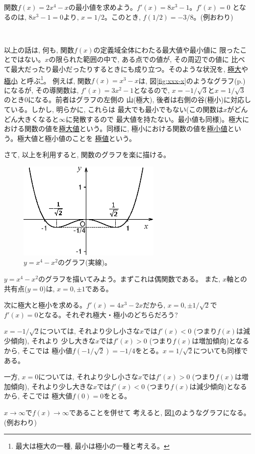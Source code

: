 \begin{exmpl} 関数$f(x)=2x^4-x$の最小値を求めよう。$f'(x)=8x^3-1$。$f'(x)=0$
となるのは, $8x^3-1=0$より, $x=1/2$。このとき, $f(1/2)=-3/8$。(例おわり)\end{exmpl}\

以上の話は, 何も, 関数$f(x)$の定義域全体にわたる最大値や最小値に
限ったことではない。$x$の限られた範囲の中で, ある点での値が, その周辺での値に
比べて最大だったり最小だったりするときにも成り立つ。そのような状況を, 
\underline{極大}や\underline{極小}
と呼ぶ\footnote{最大は極大の一種, 最小は極小の一種と考える。}。
例えば, 関数$f(x)=x^3-x$は, 図\ref{fig:xxx-x}のようなグラフ(p.\pageref{fig:xxx-x})になるが, 
その導関数は, $f'(x)=3x^2-1$となるので, 
$x=-1/\sqrt{3}$と$x=1/\sqrt{3}$のとき0になる。前者はグラフの左側の
山(極大), 後者は右側の谷(極小)に対応している。しかし, 明らかに, これらは
最大でも最小でもない(この関数は$x$がどんどん大きくなると$\infty$に発散するので
最大値を持たない。最小値も同様)。極大における関数の値を\underline{極大値}という。同様に, 
極小における関数の値を\underline{極小値}という。極大値と極小値のことを
\underline{極値}という。

さて, 以上を利用すると, 関数のグラフを楽に描ける。

\begin{figure}[h]
    \centering
    \includegraphics[width=7cm]{xxxx_xx.eps}
    \caption{$y=x^4-x^2$のグラフ(実線)。\label{fig:xxxx_xx}}
\end{figure}

\begin{exmpl} $y=x^4-x^2$のグラフを描いてみよう。まずこれは偶関数である。
また, $x$軸との共有点($y=0$)は, $x=0, \pm 1$である。

次に極大と極小を求める。$f'(x)=4x^3-2x$だから, $x=0, \pm 1/\sqrt{2}$で
$f'(x)=0$となる。それぞれ極大・極小のどちらだろう?

$x=-1/\sqrt{2}$については, それより少し小さな$x$では$f'(x)<0$ (つまり$f(x)$は減少傾向), それより
少し大きな$x$では$f'(x)>0$ (つまり$f(x)$は増加傾向)となるから, そこでは
極小値$f(-1/\sqrt{2})=-1/4$をとる。$x=1/\sqrt{2}$についても同様である。

一方, $x=0$については, それより少し小さな$x$では$f'(x)>0$ (つまり$f(x)$は増加傾向), 
それより少し大きな$x$では$f'(x)<0$ (つまり$f(x)$は減少傾向)となるから, そこでは
極大値$f(0)=0$をとる。

$x\rightarrow\infty$で$f(x)\rightarrow\infty$であることを併せて
考えると, 図\ref{fig:xxxx_xx}のようなグラフになる。(例おわり)\end{exmpl}


